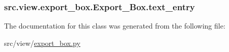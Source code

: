 \subsubsection[{text\+\_\+entry}]{\setlength{\rightskip}{0pt plus 5cm}src.\+view.\+export\+\_\+box.\+Export\+\_\+\+Box.\+text\+\_\+entry}\label{classsrc_1_1view_1_1export__box_1_1Export__Box_a94d8549aa604bd891b9f5de86f5a6f3e}


The documentation for this class was generated from the following file\+:\begin{DoxyCompactItemize}
\item 
src/view/\hyperlink{export__box_8py}{export\+\_\+box.\+py}\end{DoxyCompactItemize}
